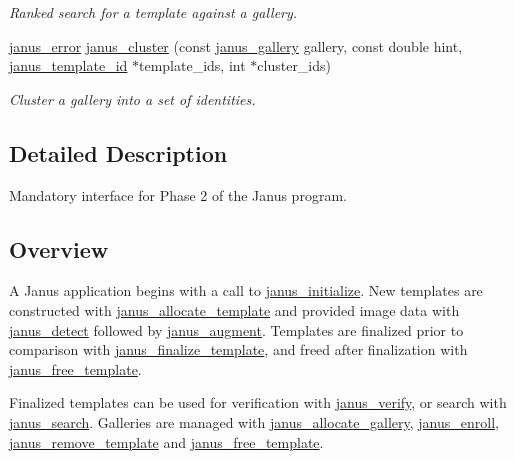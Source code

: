 \begin{DoxyCompactItemize}
\begin{DoxyCompactList}\small\item\em Ranked search for a template against a gallery. \end{DoxyCompactList}\item 
\hyperlink{group__janus_ga1b275e4dade484951b366f785597b8f6}{janus\+\_\+error} \hyperlink{group__janus_gae282d9361c185efa20f13f0edcde283e}{janus\+\_\+cluster} (const \hyperlink{group__janus_ga64368fd83d5e9abfd9ef6ab6231866e8}{janus\+\_\+gallery} gallery, const double hint, \hyperlink{group__janus_ga666a973aaa28bebd89ea5da37853bb87}{janus\+\_\+template\+\_\+id} $\ast$template\+\_\+ids, int $\ast$cluster\+\_\+ids)
\begin{DoxyCompactList}\small\item\em Cluster a gallery into a set of identities. \end{DoxyCompactList}\end{DoxyCompactItemize}


\subsection{Detailed Description}
Mandatory interface for Phase 2 of the Janus program. 

\hypertarget{group__janus_Overview}{}\subsection{Overview}\label{group__janus_Overview}
A Janus application begins with a call to \hyperlink{group__janus_gabeb9d27d8fbd3b6d00ae05f79dc4780c}{janus\+\_\+initialize}. New templates are constructed with \hyperlink{group__janus_ga8619857e68a2dacee603313b042f2fcc}{janus\+\_\+allocate\+\_\+template} and provided image data with \hyperlink{group__janus_ga1995d0f4c4d5442a3457e82b340fc616}{janus\+\_\+detect} followed by \hyperlink{group__janus_gab3a757ffae4d2c4f604543a71ae06399}{janus\+\_\+augment}. Templates are finalized prior to comparison with \hyperlink{group__janus_ga8866f19be5375a9139ce8a20b9af45b2}{janus\+\_\+finalize\+\_\+template}, and freed after finalization with \hyperlink{group__janus_gaa4a9154ad52b30392a4ed01a5b30a4c5}{janus\+\_\+free\+\_\+template}.

Finalized templates can be used for verification with \hyperlink{group__janus_gac59b09b7014e19ad2c270f44da9f8e83}{janus\+\_\+verify}, or search with \hyperlink{group__janus_ga3ad534c34ae38082eb49ce8457545653}{janus\+\_\+search}. Galleries are managed with \hyperlink{group__janus_ga38b61036a5fb27671ee104c61f35a0b7}{janus\+\_\+allocate\+\_\+gallery}, \hyperlink{group__janus_ga15142aae31a6ce2365776e7ff1ef4dfb}{janus\+\_\+enroll}, \hyperlink{group__janus_gafa0ed65ab1b78ff570142f36cf506f38}{janus\+\_\+remove\+\_\+template} and \hyperlink{group__janus_gaa4a9154ad52b30392a4ed01a5b30a4c5}{janus\+\_\+free\+\_\+template}.

